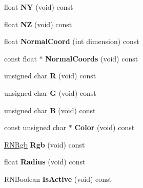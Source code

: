 \begin{DoxyCompactItemize}
\item 
float {\bfseries NY} (void) const \hypertarget{class_r3_surfel_a7dc895b6d28d184518e1fe2b09cb6a69}{}\label{class_r3_surfel_a7dc895b6d28d184518e1fe2b09cb6a69}

\item 
float {\bfseries NZ} (void) const \hypertarget{class_r3_surfel_a445371a7e7baed5c2099473bf823613f}{}\label{class_r3_surfel_a445371a7e7baed5c2099473bf823613f}

\item 
float {\bfseries Normal\+Coord} (int dimension) const \hypertarget{class_r3_surfel_a5b3ce26ef86c85fa155f575b0c441739}{}\label{class_r3_surfel_a5b3ce26ef86c85fa155f575b0c441739}

\item 
const float $\ast$ {\bfseries Normal\+Coords} (void) const \hypertarget{class_r3_surfel_ace25c8449707b52079df59fe513e80d4}{}\label{class_r3_surfel_ace25c8449707b52079df59fe513e80d4}

\item 
unsigned char {\bfseries R} (void) const \hypertarget{class_r3_surfel_a85c54b86829073b779b54776df5e0826}{}\label{class_r3_surfel_a85c54b86829073b779b54776df5e0826}

\item 
unsigned char {\bfseries G} (void) const \hypertarget{class_r3_surfel_a25e44ca53d42c3de2d287217d3e81279}{}\label{class_r3_surfel_a25e44ca53d42c3de2d287217d3e81279}

\item 
unsigned char {\bfseries B} (void) const \hypertarget{class_r3_surfel_afe210241ea742850736aa8065ab9ea9d}{}\label{class_r3_surfel_afe210241ea742850736aa8065ab9ea9d}

\item 
const unsigned char $\ast$ {\bfseries Color} (void) const \hypertarget{class_r3_surfel_a2e2472fdb8846ebedcef8520400fd57a}{}\label{class_r3_surfel_a2e2472fdb8846ebedcef8520400fd57a}

\item 
\hyperlink{class_r_n_rgb}{R\+N\+Rgb} {\bfseries Rgb} (void) const \hypertarget{class_r3_surfel_ad32689888880a16d6134ab5a283632ee}{}\label{class_r3_surfel_ad32689888880a16d6134ab5a283632ee}

\item 
float {\bfseries Radius} (void) const \hypertarget{class_r3_surfel_a10be2b9bd6406edb815329c3e137112f}{}\label{class_r3_surfel_a10be2b9bd6406edb815329c3e137112f}

\item 
R\+N\+Boolean {\bfseries Is\+Active} (void) const \hypertarget{class_r3_surfel_af9583a53431a81e940db541a2c1b66a9}{}\label{class_r3_surfel_af9583a53431a81e940db541a2c1b66a9}


\end{DoxyCompactItemize}
